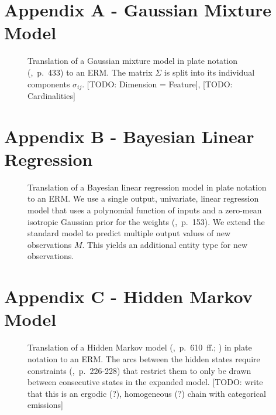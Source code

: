 \section*{Appendix A - Gaussian Mixture Model}

\vspace*{1em}
\begin{figure}[h!]
\centering
\scalebox{\tikzScale}{\adjustTikzSize }
\caption[Gaussian mixture model plate model to ERM translation]{Translation of a Gaussian mixture model in plate notation (\cite{bishop2006pattern},~p.~433) to an ERM. The matrix $\Sigma$ is split into its individual components $\sigma_{ij}$. [TODO: Dimension = Feature], [TODO: Cardinalities]}\label{fig:gaussian_mixture}
\end{figure}

\newpage

\section*{Appendix B - Bayesian Linear Regression}

\vspace*{1em}
\begin{figure}[h!]
\centering
\scalebox{\tikzScale}{\adjustTikzSize }
\caption[Linear regression plate model to ERM translation]{Translation of a Bayesian linear regression model in plate notation to an ERM. We use a single output, univariate, linear regression model that uses a polynomial function of inputs and a zero-mean isotropic Gaussian prior for the weights (\cite{bishop2006pattern},~p.~153). We extend the standard model to predict multiple output values of new observations $M$. This yields an additional entity type for new observations.}\label{fig:bayesian_regression}
\end{figure}

\newpage

\section*{Appendix C - Hidden Markov Model}

\vspace*{1em}
\begin{figure}[h!]
\centering
\scalebox{\tikzScale}{\adjustTikzSize }
\caption[Hidden Markov model in plate notation to ERM translation]{Translation of a Hidden Markov model (\cite{bishop2006pattern},~p.~610~ff.; \cite{baum1970maximization}) in plate notation to an ERM. The arcs between the hidden states require constraints (\cite{heckerman2007probabilistic},~p.~226-228) that restrict them to only be drawn between consecutive states in the expanded model. [TODO: write that this is an ergodic (?), homogeneous (?) chain with categorical emissions]}\label{fig:appendix_hmm}
\end{figure}

